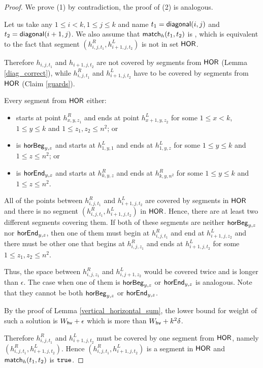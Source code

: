 \begin{proof}
We prove (1) by contradiction, the proof of (2) is analogous.

Let us take any $1 \le i < k, 1 \le j \le k$
and name $t_1 = \mathsf{diagonal}(i, j)$ and $t_2 = \mathsf{diagonal}(i+1, j)$.
We also assume that $\mathsf{match}_h(t_1,t_2)$ is \false,
which is equivalent to the fact that
segment $(h_{i,j,t_1}^R, h_{i+1,j,t_2}^L)$
is not in set $\mathsf{HOR}$.

Therefore $h_{i,j,t_1}$ and $h_{i+1,j,t_2}$
are not covered by segments from $\mathsf{HOR}$ (Lemma \ref{diag_correct}),
while $h^R_{i,j,t_1}$ and $h^L_{i+1,j,t_2}$
have to be covered by segments from $\mathsf{HOR}$ (Claim \ref{guards}).


Every segment from $\mathsf{HOR}$ either:
\begin{itemize}
\item starts at point $h^R_{x,y,z_1}$
and ends at point $h^L_{x+1,y,z_2}$ for some
$1 \le x < k$,$1 \le y \le k$ and $1 \le z_1, z_2 \le n^2$; or
\item is $\mathsf{horBeg}_{y,z}$ 
and starts at $h^L_{1,y,1}$ and ends at $h^L_{1,y,z}$ for some $1 \le y \le k$ and $1 \le z \le n^2$; or
\item is $\mathsf{horEnd}_{y,z}$
and starts at $h^R_{k,y,z}$ and ends at $h^R_{k,y,n^2}$ for some $1 \le y \le k$ and $1 \le z \le n^2$.
\end{itemize}
All of the points between $h^R_{i,j,t_1}$ and $h^L_{i+1,j,t_2}$
are covered by segments in $\mathsf{HOR}$ 
and there is no segment $(h^R_{i,j,t_1}, h^L_{i+1,j,t_2})$ in $\mathsf{HOR}$.
Hence, there are at least two different segments covering them.
If both of these segments are neither $\mathsf{horBeg}_{y,z}$ nor $\mathsf{horEnd}_{y,z}$,
then one of them must begin
at $h^R_{i,j,t_1}$ and end at $h^L_{i+1,j,z_2}$
and there must be other one that begins at $h^R_{i,j,z_1}$
and ends at $h^L_{i+1,j,t_2}$
for some $1 \le z_1, z_2 \le n^2$.

Thus, the space between $h^R_{i,j,z_1}$ and $h^L_{i,j+1,z_2}$
would be covered twice and is longer than $\epsilon$.
The case when one of them is $\mathsf{horBeg}_{y,z}$ or $\mathsf{horEnd}_{y,z}$ is analogous.
Note that they cannot be both $\mathsf{horBeg}_{y,z}$ or $\mathsf{horEnd}_{y,z}$.

By the proof of Lemma \ref{vertical_horizontal_sum},
the lower bound for weight of such a solution is $W_{\mathsf{hv}} + \epsilon$
which is more than $W_{\mathsf{hv}}+k^2\delta$.

Therefore $h^R_{i,j,t_1}$ and $h^L_{i+1,j,t_2}$ must be covered
by one segment from $\mathsf{HOR}$, namely $(h^R_{i,j,t_1}, h^L_{i+1,j,t_2})$.
Hence $(h^R_{i,j,t_1}, h^L_{i+1,j,t_2})$ is a segment in $\mathsf{HOR}$
and $\mathsf{match}_h(t_1,t_2)$ is $\texttt{true}$.
\end{proof}


